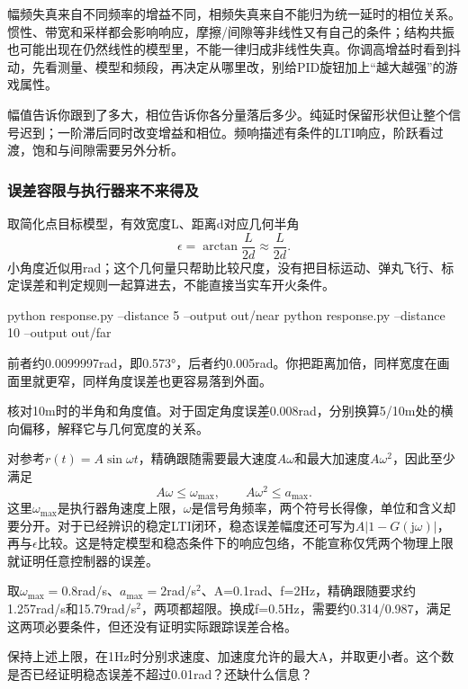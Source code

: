 幅频失真来自不同频率的增益不同，相频失真来自不能归为统一延时的相位关系。惯性、带宽和采样都会影响响应，摩擦/间隙等非线性又有自己的条件；结构共振也可能出现在仍然线性的模型里，不能一律归成非线性失真。你调高增益时看到抖动，先看测量、模型和频段，再决定从哪里改，别给PID旋钮加上“越大越强”的游戏属性。
\begin{conclusion}
幅值告诉你跟到了多大，相位告诉你各分量落后多少。纯延时保留形状但让整个信号迟到；一阶滞后同时改变增益和相位。频响描述有条件的LTI响应，阶跃看过渡，饱和与间隙需要另外分析。
\end{conclusion}

\subsubsection{误差容限与执行器来不来得及}
取简化点目标模型，有效宽度L、距离d对应几何半角
\[
\epsilon=\arctan\frac{L}{2d}\approx\frac{L}{2d}.
\]
小角度近似用rad；这个几何量只帮助比较尺度，没有把目标运动、弹丸飞行、标定误差和判定规则一起算进去，不能直接当实车开火条件。
\begin{example}[还是原来的0.1m与5m]
\begin{tbash}
python response.py --distance 5 --output out/near
python response.py --distance 10 --output out/far
\end{tbash}
前者约0.0099997rad，即0.573°，后者约0.005rad。你把距离加倍，同样宽度在画面里就更窄，同样角度误差也更容易落到外面。
\end{example}
\begin{exercise}\label{ex:v2-mpc-tolerance}
核对10m时的半角和角度值。对于固定角度误差0.008rad，分别换算5/10m处的横向偏移，解释它与几何宽度的关系。
\end{exercise}

对参考$r(t)=A\sin\omega t$，精确跟随需要最大速度$A\omega$和最大加速度$A\omega^2$，因此至少满足
\[
A\omega\le\omega_{\max},\qquad A\omega^2\le a_{\max}.
\]
这里$\omega_{\max}$是执行器角速度上限，$\omega$是信号角频率，两个符号长得像，单位和含义却要分开。对于已经辨识的稳定LTI闭环，稳态误差幅度还可写为$A|1-G(\mathrm j\omega)|$，再与$\epsilon$比较。这是特定模型和稳态条件下的响应包络，不能宣称仅凭两个物理上限就证明任意控制器的误差。
\begin{example}[先排除根本跟不上的参考]
取$\omega_{\max}=0.8$rad/s、$a_{\max}=2$rad/s$^2$、A=0.1rad、f=2Hz，精确跟随要求约1.257rad/s和15.79rad/s$^2$，两项都超限。换成f=0.5Hz，需要约0.314/0.987，满足这两项必要条件，但还没有证明实际跟踪误差合格。
\end{example}
\begin{exercise}\label{ex:v2-mpc-envelope}
保持上述上限，在1Hz时分别求速度、加速度允许的最大A，并取更小者。这个数是否已经证明稳态误差不超过0.01rad？还缺什么信息？
\end{exercise}

